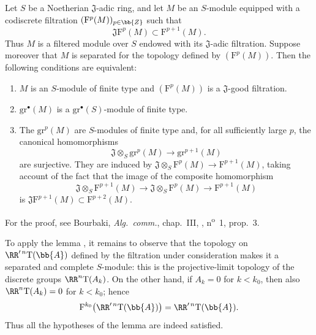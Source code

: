 \begin{lemma}[13.7.7.2]
\label{0.13.7.7.2}
Let $S$ be a Noetherian $\mathfrak{J}$-adic ring, and let $M$
be an $S$-module equipped with a codiscrete filtration
$(\mathrm{F}^p(M))_{p\in\bb{Z}}$ such that
\[
  \mathfrak{J}\mathrm{F}^p(M)
  \subset
  \mathrm{F}^{p+1}(M).
\]
Thus $M$ is a filtered module over $S$ endowed with its
$\mathfrak{J}$-adic filtration.
Suppose moreover that $M$ is separated for the topology defined by
$(\mathrm{F}^p(M))$.
Then the following conditions are equivalent:
\begin{enumerate}
  \item[{\rm a)}] $M$ is an $S$-module of finite type and
  $(\mathrm{F}^p(M))$ is a $\mathfrak{J}$-good filtration.
  \item[{\rm b)}] $\mathrm{gr}^\bullet(M)$ is a
  $\mathrm{gr}^\bullet(S)$-module of finite type.
  \item[{\rm c)}] The $\mathrm{gr}^p(M)$ are $S$-modules of
  finite type and, for all sufficiently large $p$, the canonical
  homomorphisms
  \begin{equation}
  \label{0.13.7.7.3}
  \tag{13.7.7.3}
    \mathfrak{J}\otimes_S\mathrm{gr}^p(M)
    \longrightarrow
    \mathrm{gr}^{p+1}(M)
  \end{equation}
  are surjective.
  They are induced by
  $\mathfrak{J}\otimes_S\mathrm{F}^p(M)
  \longrightarrow\mathrm{F}^{p+1}(M)$, taking account of the fact
  that the image of the composite homomorphism
  \[
    \mathfrak{J}\otimes_S\mathrm{F}^{p+1}(M)
    \longrightarrow
    \mathfrak{J}\otimes_S\mathrm{F}^p(M)
    \longrightarrow
    \mathrm{F}^{p+1}(M)
  \]
  is
  $\mathfrak{J}\mathrm{F}^{p+1}(M)
  \subset\mathrm{F}^{p+2}(M)$.
\end{enumerate}

For the proof, see Bourbaki, \emph{Alg.\ comm.}, chap.~III,
, n\textsuperscript{o}~1, prop.~3.
\end{lemma}

\begin{env}[13.7.7.4]
\label{0.13.7.7.4}
To apply the lemma , it remains to observe that the
topology on $\RR'^{\,n}\mathrm{T}(\bb{A})$ defined by the filtration
under consideration makes it a separated and complete $S$-module:
this is the projective-limit topology of the discrete groups
$\RR^n\mathrm{T}(A_k)$.
On the other hand, if $A_k=0$ for $k<k_0$, then also
$\RR^n\mathrm{T}(A_k)=0$ for $k<k_0$; hence
\[
  \mathrm{F}^{k_0}\bigl(\RR'^{\,n}\mathrm{T}(\bb{A})\bigr)
  =
  \RR'^{\,n}\mathrm{T}(\bb{A}).
\]
Thus all the hypotheses of the lemma are indeed satisfied.
\end{env}

